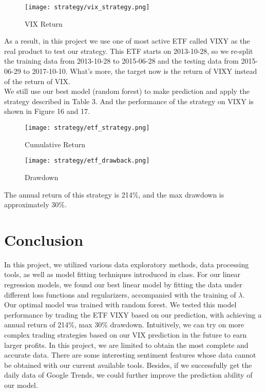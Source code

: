 \documentclass[fleqn,10pt]{SelfArx} %
\begin{document}
\begin{figure}[ht]\centering %
\texttt{[image: strategy/vix\_strategy.png]}
\caption{VIX Return}
\label{fig:view}
\end{figure}

\noindent
As a result, in this project we use one of most active ETF called VIXY as the real product to test our strategy. This ETF starts on 2013-10-28, so we re-split the training data from 2013-10-28 to 2015-06-28 and the testing data from 2015-06-29 to 2017-10-10. What’s more, the target now is the return of VIXY instead of the return of VIX.\\

\noindent
We still use our best model (random forest) to make prediction and apply the strategy described in Table 3. And the performance of the strategy on VIXY is shown in Figure 16 and 17.

\begin{figure}[ht]\centering %
\texttt{[image: strategy/etf\_strategy.png]}
\caption{Cumulative Return}
\label{fig:view}
\end{figure}
\noindent

\begin{figure}[ht]\centering %
\texttt{[image: strategy/etf\_drawback.png]}
\caption{Drawdown}
\label{fig:view}
\end{figure}

\noindent
The annual return of this strategy is 214\%, and the max drawdown is approximately 30\%. 

\section{Conclusion}

In this project, we utilized various data exploratory methods, data processing tools, as well as model fitting techniques introduced in class. For our linear regression models, we found our best linear model by fitting the data under different loss functions and regularizers, accompanied with the training of $\lambda$. \\

\noindent
Our optimal model was trained with random forest. We tested this model performance by trading the ETF VIXY based on our prediction, with achieving a annual return of 214\%, max 30\% drawdown. Intuitively, we can try on more complex trading strategies based on our VIX prediction in the future to earn larger profits. In this project, we are limited to obtain the most complete and accurate data. There are some interesting sentiment features whose data cannot be obtained with our current available tools. Besides, if we successfully get the daily data of Google Trends, we could further improve the prediction ability of our model. \\
\end{document}
